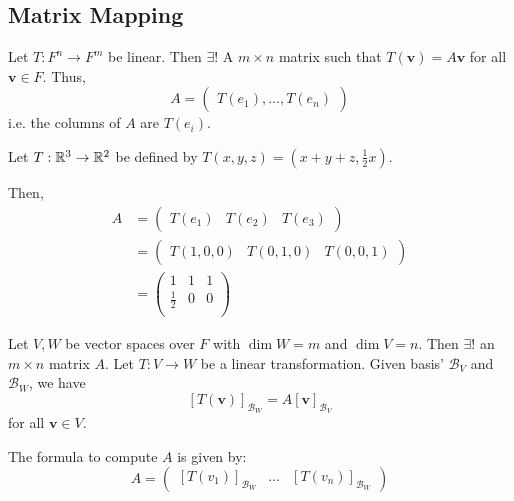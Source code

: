 \documentclass{article}
\begin{document}
\subsection{Matrix Mapping}
\begin{theorem}
  Let $T: F^n \to F^m$ be linear. Then $\exists!$ A $m \times n$ matrix such that $T(\textbf{v}) = A\textbf{v}$ for all $\textbf{v} \in F$. Thus,
  \[A =
    \begin{pmatrix}
      T(e_1), \ldots, T(e_n)
  \end{pmatrix}\] i.e. the columns of $A$ are $T(e_i)$.
\end{theorem}
\begin{example}
  Let $T: \mathbb{R}^3 \to \mathbb{R}^2$ be defined by $T(x, y, z) = (x+y+z, \frac{1}{2}x)$.

  Then,
  \begin{align*}
    A &=
    \begin{pmatrix}
      T(e_1) & T(e_2) &T(e_3)
    \end{pmatrix}\\
    &=
    \begin{pmatrix}
      T(1, 0, 0) & T(0, 1, 0) & T(0, 0, 1)
    \end{pmatrix}\\
    &=
    \begin{pmatrix}
      1 & 1 & 1\\
      \frac{1}{2} & 0 & 0\\
    \end{pmatrix}
  \end{align*}
\end{example}
\begin{theorem}
  Let $V, W$ be vector spaces over $F$ with $\dim W = m$ and $\dim V = n$. Then $\exists!$ an $m \times n$ matrix $A$. Let $T: V \to W$ be a linear transformation. Given basis' $\mathcal{B}_V$ and $\mathcal{B}_W$, we have \[
    [T(\textbf{v})]_{\mathcal{B}_W} = A[\textbf{v}]_{\mathcal{B}_V}
  \] for all $\textbf{v} \in V$.

  The formula to compute $A$ is given by:
  \[
    A =
    \begin{pmatrix}
      [T(v_1)]_{\mathcal{B}_W} & \ldots & [T(v_n)]_{\mathcal{B}_W}
    \end{pmatrix}
  \]

\end{theorem}
\end{document}
